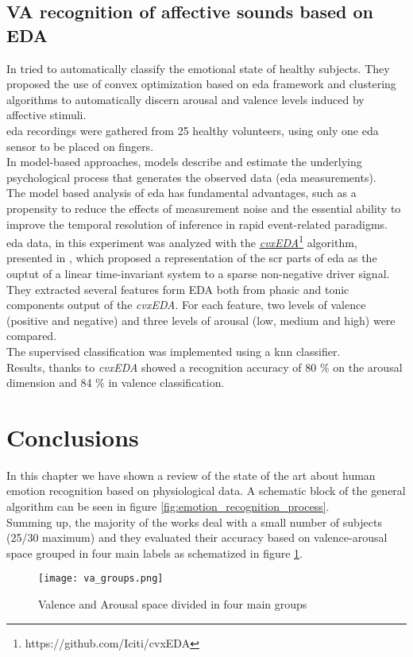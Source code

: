 \subsection{VA recognition of affective sounds based on EDA}
In \cite{greco2016arousal} tried to automatically classify the emotional state of healthy subjects. They proposed the use of convex optimization based on \gls{eda} framework and clustering algorithms to automatically discern arousal and valence levels induced by affective stimuli.
\\ \indent
\gls{eda} recordings were gathered from 25 healthy volunteers, using only one \gls{eda} sensor to be placed on fingers.
\\
In model-based approaches, models describe and estimate the underlying psychological process that generates the observed data (\gls{eda} measurements).
\\
The model based analysis of \gls{eda} has fundamental advantages, such as a propensity to reduce the effects of measurement noise and the essential ability to improve the temporal resolution of inference in rapid event-related paradigms.
\\ \indent
\gls{eda} data, in this experiment was analyzed with the \href{https://github.com/Iciti/cvxEDA}{\textit{cvxEDA}}\footnote{https://github.com/Iciti/cvxEDA} algorithm, presented in \cite{greco2015cvxeda}, which proposed a representation of the \gls{scr} parts of \gls{eda} as the ouptut of a linear time-invariant system to a sparse non-negative driver signal.
\\ \indent
They extracted several features form EDA both from phasic and tonic components output of the \textit{cvxEDA}. For each feature, two levels of valence (positive and negative) and three levels of arousal (low, medium and high) were compared.
\\
The supervised classification was implemented using a \gls{knn} classifier.
\\ \indent
Results, thanks to \textit{cvxEDA} showed a recognition accuracy of 80 \% on the arousal dimension and 84 \% in valence classification.

\section{Conclusions}
In this chapter we have shown a review of the state of the art about human emotion recognition based on physiological data. A schematic block of the general algorithm can be seen in figure \ref{fig:emotion_recognition_process}.
\\
Summing up, the majority of the works deal with a small number of subjects (25/30 maximum) and they evaluated their accuracy based on valence-arousal space grouped in four main labels as schematized in figure \ref{fig:va_groups}.
\begin{figure}[h]
    \centering
    \texttt{[image: va\_groups.png]} 
	\caption{Valence and Arousal space divided in four main groups}
    \label{fig:va_groups}
\end{figure}